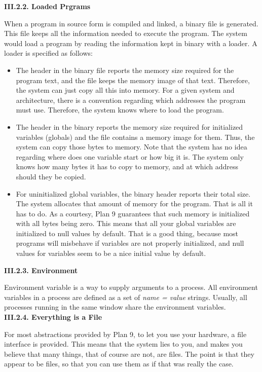 \documentclass[a4paper,12pt]{report}
\begin{document}
\noindent
\textbf{III.2.2. Loaded Prgrams}

\noindent
When a program in source form is compiled and linked, a binary file is generated. This file keeps all the information needed to execute the program. The system would load a program by reading the information kept in binary with a loader. A loader is specified as follows:
\begin{itemize}
\item The header in the binary file reports the memory size required for the program text, and the file keeps the memory image of that text. Therefore, the system can just copy all this into memory. For a given system and architecture, there is a convention regarding which addresses the program must use. Therefore, the system knows where to load the program.
\item The header in the binary reports the memory size required for initialized variables (globals) and the file contains a memory image for them. Thus, the system can copy those bytes to memory. Note that the system has no idea regarding where does one variable start or how big it is. The system only knows how many bytes it has to copy to memory, and at which address should they be copied. 
\item For uninitialized global variables, the binary header reports their total size. The system allocates that amount of memory for the program. That is all it has to do. As a courtesy, Plan 9 guarantees that such memory is initialized with all bytes being zero. This means that all your global variables are initialized to null values by default. That is a good thing, because most programs will misbehave if variables are not properly initialized, and null values for variables seem to be a nice initial value by default.
\end{itemize}

\noindent
\textbf{III.2.3. Environment}

\noindent
Environment variable is a way to supply arguments to a process. All environment variables in a process are defined as a set of \textit{name = value} strings. Usually, all processes running in the same window share the environment variables.\\

\noindent
\textbf{III.2.4. Everything is a File}

\noindent
For most abstractions provided by Plan 9, to let you use your hardware, a file interface is provided. This means that the system lies to you, and makes you believe that many things, that of course are not, are files. The point is that they appear to be files, so that
you can use them as if that was really the case.\\
\end{document}
